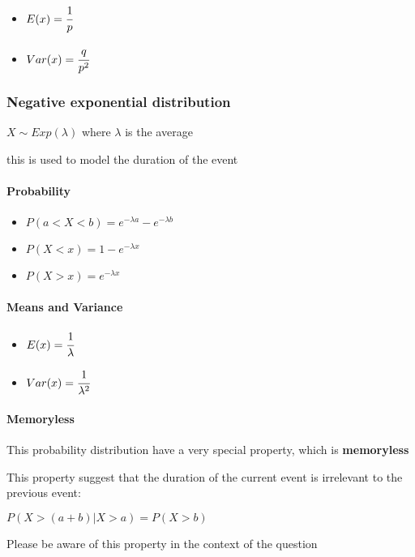 \documentclass[]{article}
\let\oldparagraph\paragraph
\renewcommand{\paragraph}[1]{\oldparagraph{#1}\mbox{}}
\begin{document}
\begin{itemize}
\item
  \(E(x) = \cfrac{1}{p}\)
\item
  \(Var(x) = \cfrac{q}{p^2}\)
\end{itemize}

\subsubsection{Negative exponential distribution}\label{header-n97}

\(X\sim Exp(\lambda)\) where \(\lambda\) is the average

this is used to model the duration of the event

\paragraph{Probability}\label{header-n101}

\begin{itemize}
\item
  \(P(a<X<b) = e^{-\lambda a} - e^{-\lambda b}\)
\item
  \(P(X<x) = 1-e^{-\lambda x}\)
\item
  \(P(X > x) = e^{-\lambda x}\)
\end{itemize}

\paragraph{Means and Variance}\label{header-n103}

\begin{itemize}
\item
  \(E(x) = \cfrac{1}{\lambda}\)
\item
  \(Var(x) =  \cfrac{1}{\lambda^2}\)
\end{itemize}

\paragraph{Memoryless}\label{header-n404}

This probability distribution have a very special property, which is
\textbf{memoryless}

This property suggest that the duration of the current event is
irrelevant to the previous event:

\(P(X>(a+b)|X>a) = P(X>b)\)

Please be aware of this property in the context of the question
\end{document}
